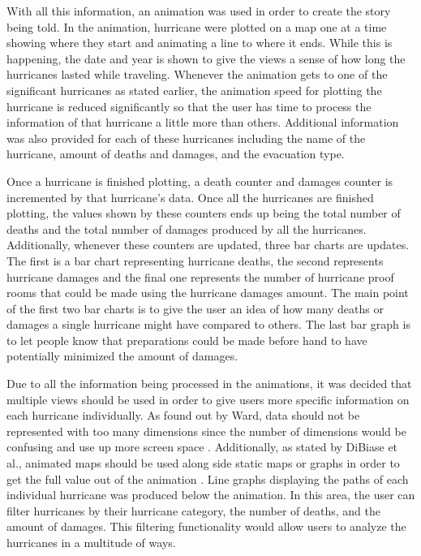 With  all this information, an animation was used in order to create the story being told. In the animation, hurricane were plotted on a map one at a time showing where they start and animating a line to where it ends. While this is happening, the date and year is shown to give the views a sense of how long the hurricanes lasted while traveling. Whenever the animation gets to one of the significant hurricanes as stated earlier, the animation speed for plotting the hurricane is reduced significantly so that the user has time to process the information of that hurricane a little more than others. Additional information was also provided for each of these hurricanes including the name of the hurricane, amount of deaths and damages, and the evacuation type.

Once a hurricane is finished plotting, a death counter and damages counter is incremented by that hurricane's data. Once all the hurricanes are finished plotting, the values shown by these counters ends up being the total number of deaths and the total number of damages produced by all the hurricanes. Additionally, whenever these counters are updated, three bar charts are updates. The first is a bar chart representing hurricane deaths, the second represents hurricane damages and the final one represents the number of hurricane proof rooms that could be made using the hurricane damages amount. The main point of the first two bar charts is to give the user an idea of how many deaths or damages a single hurricane might have compared to others. The last bar graph is to let people know that preparations could be made before hand to have potentially minimized the amount of damages.

Due to all the information being processed in the animations, it was decided that multiple views should be used in order to give users more specific information on each hurricane individually. As found out by Ward, data should not be represented with too many dimensions since the number of dimensions would be confusing and use up more screen space \cite{ward1994xmdvtool}. Additionally, as stated by DiBiase et al., animated maps should be used along side static maps or graphs in order to get the full value out of the animation \cite{dibiase1992animation}.  Line graphs displaying the paths of each individual hurricane was produced below the animation. In this area, the user can filter hurricanes by their hurricane category, the number of deaths, and the amount of damages. This filtering functionality would allow users to analyze the hurricanes in a multitude of ways. 

